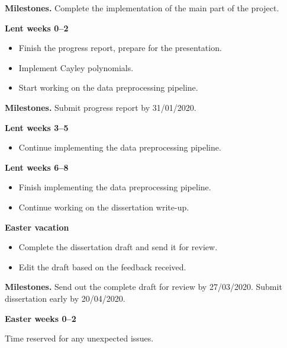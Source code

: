 \documentclass[12pt,a4paper,twoside]{article}
\begin{document}
\textbf{Milestones.} Complete the implementation of the main part of the project.

\textbf{Lent weeks 0–2}
\begin{itemize}
  \item Finish the progress report, prepare for the presentation.
  \item Implement Cayley polynomials.
  \item Start working on the data preprocessing pipeline.
\end{itemize}
 
\textbf{Milestones.} Submit progress report by 31/01/2020.

\textbf{Lent weeks 3–5}
\begin{itemize}
  \item Continue implementing the data preprocessing pipeline.
\end{itemize}


\textbf{Lent weeks 6–8}
\begin{itemize}
  \item Finish implementing the data preprocessing pipeline.
  \item Continue working on the dissertation write-up.
\end{itemize}

\textbf{Easter vacation}
\begin{itemize}
  \item Complete the dissertation draft and send it for review.
  \item Edit the draft based on the feedback received.
\end{itemize}

\textbf{Milestones.} Send out the complete draft for review by 27/03/2020. Submit dissertation early by 20/04/2020.

\textbf{Easter weeks 0–2}

 Time reserved for any unexpected issues.



\end{document}

